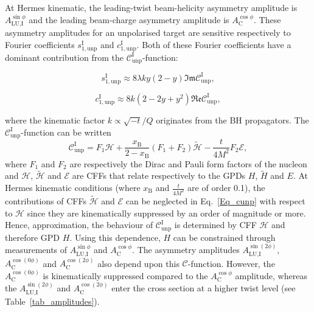 At H{\sc ermes} kinematic, the leading-twist beam-helicity asymmetry amplitude is $A_{\textrm{LU,I}}^{\sin\phi}$ and the leading beam-charge asymmetry amplitude is $A^{\cos\phi}_{\textrm{C}}$. These asymmetry amplitudes for an unpolarised target are sensitive respectively to Fourier coefficients $s_{1,\textrm{unp}}^{\textrm{I}}$ and $c_{1,\textrm{unp}}^{\textrm{I}}$. Both of these Fourier coefficients have a dominant contribution from the $\mathcal{C}_{\textrm{unp}}^{\textrm{I}}$-function:
\begin{center}
\begin{equation}
 s_{1,\textrm{unp}}^{\textrm{I}} \approx 8\lambda ky(2-y)\mathfrak{Im}\mathcal{C}_{\textrm{unp}}^{\textrm{I}},
\label{eq:s1}
\end{equation}
\end{center}
\begin{center}
\begin{equation}
 c_{1,\textrm{unp}}^{\textrm{I}} \approx 8k(2- 2y + y^{2})\mathfrak{Re}\mathcal{C}_{\textrm{unp}}^{\textrm{I}},
\label{eq:c1}
\end{equation}
\end{center}
where the kinematic factor $k \propto \sqrt{-t}/Q$ originates from the BH
propagators. The $\mathcal{C}_{\textrm{unp}}^{\textrm{I}}$-function can be
written
\cite{Belitsky2002} 
\begin{equation}
 \mathcal{C}_{\textrm{unp}}^{\textrm{I}} = F_{1}\mathcal{H} + \frac{x_{\textrm{B}}}{2-x_{\textrm{B}}}(F_{1}+F_{2})\widetilde{\mathcal{H}} -\frac{t}{4M^{2}}F_{2}\mathcal{E},
\label{Eq_cunp}
\end{equation}
where $F_{1}$ and $F_{2}$ are respectively the Dirac and Pauli form
factors of the nucleon and $\mathcal{H}$, $\widetilde{\mathcal{H}}$ and
$\mathcal{E}$ are CFFs that relate respectively to the GPDs $H$,
$\widetilde{H}$ and $E$.  At H{\sc ermes} kinematic
conditions (where $x_{\textrm{B}}$ and $\frac{t}{4M^2}$ are of order 0.1),  the
contributions of CFFs $\widetilde{\mathcal{H}}$ and $\mathcal{E}$ can be
neglected in Eq.~\ref{Eq_cunp} with respect to $\mathcal{H}$ since they
are kinematically suppressed by an order of magnitude or more.
Hence,  approximation, the behaviour of
$\mathcal{C}_{\textrm{unp}}^{\textrm{I}}$ is determined by CFF $\mathcal{H}$
and therefore GPD $H$. Using this dependence, $H$ can be constrained through
measurements of $A_{\textrm{LU,I}}^{\sin\phi}$ and $A^{\cos\phi}_{\textrm{C}}$.
The asymmetry amplitudes $A_{\textrm{LU},\textrm{I}}^{\sin(2\phi)}$,
$A^{\cos(0\phi)}_{\textrm{C}}$ and $A^{\cos(2\phi)}_{\textrm{C}}$ also depend
upon this $\mathcal{C}$-function. However, the $A^{\cos(0\phi)}_{\textrm{C}}$  is kinematically suppressed compared to the $A^{\cos\phi}_{\textrm{C}}$ amplitude, whereas the  $A_{\textrm{LU,I}}^{\sin(2\phi)}$ and $A^{\cos(2\phi)}_{\textrm{C}}$  enter the cross section at a higher
twist level (see Table~\ref{tab_amplitudes}).

